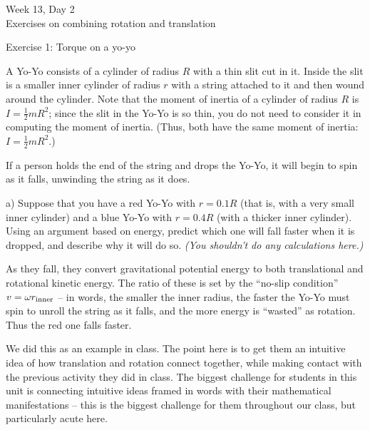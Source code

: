 \documentclass[12pt]{article}
\begin{document}
\Large

\begin{center}
	Week 13, Day 2 \\
	Exercises on combining rotation and translation
	
	\large
	
	\medskip
	
	Exercise 1: Torque on a yo-yo
	
\end{center}

\normalsize

\begin{minipage}{0.6\textwidth}
A Yo-Yo consists of a cylinder of radius $R$ with a thin slit cut in it. Inside the slit is a smaller inner cylinder of radius $r$ with a string attached to it and then wound around the cylinder. Note that the moment of inertia of a cylinder of radius $R$ is $I=\frac{1}{2}mR^2$; since the slit in the Yo-Yo is so thin, you do not need to consider it in computing the moment of inertia. (Thus, both have the same moment of inertia: $I=\frac{1}{2}mR^2$.)

If a person holds the end of the string and drops the Yo-Yo, it will begin to spin as it falls, unwinding the string as it does. 

\bigskip\bigskip

a) Suppose that you have a red Yo-Yo with $r=0.1 R$ (that is, with a very small inner cylinder) and a blue Yo-Yo with $r=0.4 R$ (with a thicker inner cylinder). Using an argument based on energy, predict which one will fall faster when it is dropped, and describe why it will do so. \textit{(You shouldn't do any calculations here.)}

{\color{red}As they fall, they convert gravitational potential energy to both translational and rotational kinetic energy. The ratio of these is set by the ``no-slip condition'' $v= \omega r_{\rm inner}$ -- in words, the smaller the inner radius, the faster the Yo-Yo must spin to unroll the string as it falls, and the more energy is ``wasted'' as rotation. Thus the red one falls faster.}

\bigskip

{\color{blue}We did this as an example in class. The point here is to get them an intuitive idea of how translation and rotation connect together, while making contact with the previous activity they did in class. The biggest challenge for students in this unit is connecting intuitive ideas framed in words with their mathematical manifestations -- this is the biggest challenge for them throughout our class, but particularly acute here.}
\end{minipage}
\end{document}
